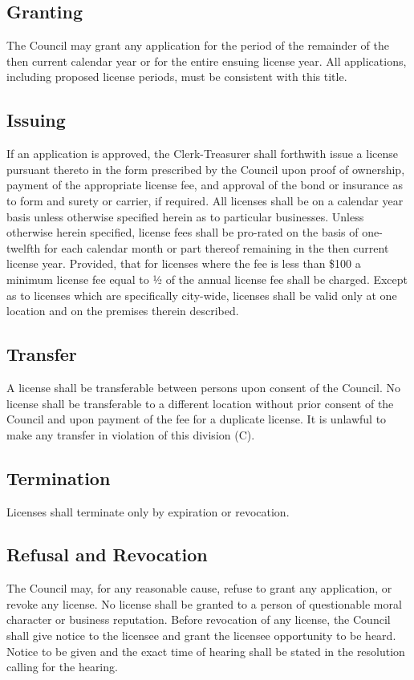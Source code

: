 \subsection{Granting}
The Council may grant any application for the period of the remainder of the then current calendar year or for the entire ensuing license year.  All applications, including proposed license periods, must be consistent with this title.
\subsection{Issuing}
If an application is approved, the Clerk-Treasurer shall forthwith issue a license pursuant thereto in the form prescribed by the Council upon proof of ownership, payment of the appropriate license fee, and approval of the bond or insurance as to form and surety or carrier, if required.  All licenses shall be on a calendar year basis unless otherwise specified herein as to particular businesses.  Unless otherwise herein specified, license fees shall be pro-rated on the basis of one-twelfth for each calendar month or part thereof remaining in the then current license year.  Provided, that for licenses where the fee is less than \$100 a minimum license fee equal to ½ of the annual license fee shall be charged.  Except as to licenses which are specifically city-wide, licenses shall be valid only at one location and on the premises therein described.
\subsection{Transfer}
A license shall be transferable between persons upon consent of the Council.  No license shall be transferable to a different location without prior consent of the Council and upon payment of the fee for a duplicate license.  It is unlawful to make any transfer in violation of this division (C).
\subsection{Termination}
Licenses shall terminate only by expiration or revocation.
\subsection{Refusal and Revocation}
The Council may, for any reasonable cause, refuse to grant any application, or revoke any license.  No license shall be granted to a person of questionable moral character or business reputation.  Before revocation of any license, the Council shall give notice to the licensee and grant the licensee opportunity to be heard.  Notice to be given and the exact time of hearing shall be stated in the resolution calling for the hearing.
